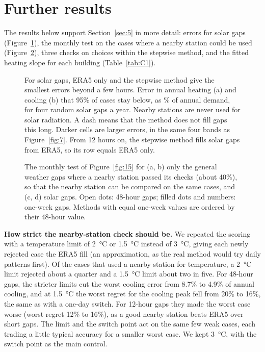 \section{Further results}\label{app:C}
\setcounter{figure}{0}\setcounter{table}{0}
\renewcommand{\thefigure}{C\arabic{figure}}
\renewcommand{\thetable}{C\arabic{table}}

The results below support Section~\ref{sec:5} in more detail: errors for solar gaps (Figure~\ref{fig:C1}), the monthly test on the cases where a nearby station could be used (Figure~\ref{fig:C2}), three checks on choices within the stepwise method, and the fitted heating slope for each building (Table~\ref{tab:C1}).

\begin{figure}[tbp]
\centering
{}
\caption{For solar gaps, ERA5 only and the stepwise method give the smallest errors beyond a few hours. Error in annual heating (a) and cooling (b) that 95\% of cases stay below, as \% of annual demand, for four random solar gaps a year. Nearby stations are never used for solar radiation. A dash means that the method does not fill gaps this long. Darker cells are larger errors, in the same four bands as Figure~\ref{fig:7}. From 12 hours on, the stepwise method fills solar gaps from ERA5, so its row equals ERA5 only.}
\label{fig:C1}
\end{figure}

\begin{figure}[tbp]
\centering
{}
\caption{The monthly test of Figure~\ref{fig:15} for (a, b) only the general weather gaps where a nearby station passed its checks (about 40\%), so that the nearby station can be compared on the same cases, and (c, d) solar gaps. Open dots: 48-hour gaps; filled dots and numbers: one-week gaps. Methods with equal one-week values are ordered by their 48-hour value.}
\label{fig:C2}
\end{figure}

\textbf{How strict the nearby-station check should be.} We repeated the scoring with a temperature limit of 2~°C or 1.5~°C instead of 3~°C, giving each newly rejected case the ERA5 fill (an approximation, as the real method would try daily patterns first). Of the cases that used a nearby station for temperature, a 2~°C limit rejected about a quarter and a 1.5~°C limit about two in five. For 48-hour gaps, the stricter limits cut the worst cooling error from 8.7\% to 4.9\% of annual cooling, and at 1.5~°C the worst regret for the cooling peak fell from 20\% to 16\%, the same as with a one-day switch. For 12-hour gaps they made the worst case worse (worst regret 12\% to 16\%), as a good nearby station beats ERA5 over short gaps. The limit and the switch point act on the same few weak cases, each trading a little typical accuracy for a smaller worst case. We kept 3~°C, with the switch point as the main control.


